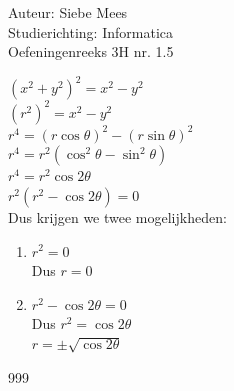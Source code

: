 \documentclass[a4paper]{article}
\begin{document}
  
\noindent \large Auteur: Siebe Mees \\
\noindent \large Studierichting: Informatica\\
\noindent \large Oefeningenreeks 3H nr. 1.5\\

\medskip

\normalsize

$(x^2+y^2)^2=x^2-y^2$\\

$\left(r^2\right)^2=x^2-y^2$\\

$r^4=\left(r\cos\theta\right)^2-\left(r\sin\theta\right)^2$\\

$r^4=r^2\left(\cos^2\theta-\sin^2\theta\right)$\\

$r^4=r^2\cos 2\theta$\\

$r^2\left(r^2-\cos 2\theta\right)=0$\\

Dus krijgen we twee mogelijkheden: \\

\begin{enumerate}
\item $r^2=0$\\

Dus $r=0$\\

\item $r^2-\cos 2\theta=0$\\

Dus $r^2=\cos 2\theta$\\

$r=\pm\sqrt{\cos 2\theta}$\\

\end{enumerate}

\begin{thebibliography}{999}
\end{thebibliography}
\end{document}
